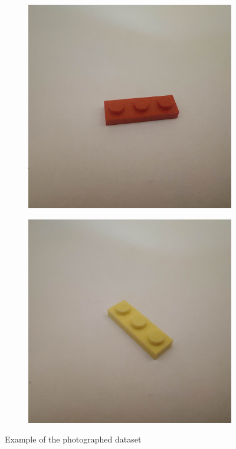 \documentclass[]{article}
\begin{document}
\begin{figure}[h]
\begin{subfigure}[b]{0.2\textwidth}
    \end{subfigure}
    \begin{subfigure}[b]{0.2\textwidth}
        \includegraphics[width=\textwidth]{photographed images/23.jpg}
    \end{subfigure}
    \begin{subfigure}[b]{0.2\textwidth}
        \includegraphics[width=\textwidth]{photographed images/24.jpg}
    \end{subfigure}
    \caption{Example of the photographed dataset}
\end{figure}
\end{document}
